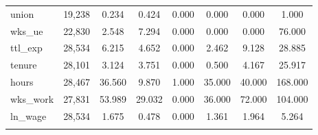 \documentclass[
  12pt,
]{article}
\begin{document}
\begin{table}[ht]
\begin{tabular}{@{\extracolsep{5pt}}lccccccc}
union & 19,238 & 0.234 & 0.424 & 0.000 & 0.000 & 0.000 & 1.000 \\ 
wks\_ue & 22,830 & 2.548 & 7.294 & 0.000 & 0.000 & 0.000 & 76.000 \\ 
ttl\_exp & 28,534 & 6.215 & 4.652 & 0.000 & 2.462 & 9.128 & 28.885 \\ 
tenure & 28,101 & 3.124 & 3.751 & 0.000 & 0.500 & 4.167 & 25.917 \\ 
hours & 28,467 & 36.560 & 9.870 & 1.000 & 35.000 & 40.000 & 168.000 \\ 
wks\_work & 27,831 & 53.989 & 29.032 & 0.000 & 36.000 & 72.000 & 104.000 \\ 
ln\_wage & 28,534 & 1.675 & 0.478 & 0.000 & 1.361 & 1.964 & 5.264 \\ 
\hline \\[-1.8ex] 
\end{tabular} 
\end{table}
\end{document}

